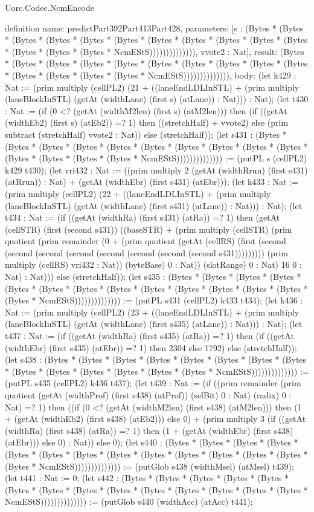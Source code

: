 \begin{lexlean}{Uorc.Codec.NcmEncode}
\begin{semanticmodule}
definition{
  name: predictPart392Part413Part428,
  parameters: [s : (Bytes * (Bytes * (Bytes * (Bytes * (Bytes * (Bytes * (Bytes * (Bytes * (Bytes * (Bytes * (Bytes * (Bytes * (Bytes * (Bytes * NcmEStS)))))))))))))), vvote2 : Nat],
  result: (Bytes * (Bytes * (Bytes * (Bytes * (Bytes * (Bytes * (Bytes * (Bytes * (Bytes * (Bytes * (Bytes * (Bytes * (Bytes * (Bytes * NcmEStS)))))))))))))),
  body: (let k429 : Nat := (prim multiply (cellPL2) (21 + ((laneEndLDLInSTL) + (prim multiply (laneBlockInSTL) (getAt (widthLane) (first s) (atLane)) : Nat))) : Nat); (let t430 : Nat := (if (0 <? (getAt (widthM2len) (first s) (atM2len))) then (if ((getAt (widthEb2) (first s) (atEb2)) =? 1) then ((stretchHalf) + vvote2) else (prim subtract (stretchHalf) vvote2 : Nat)) else (stretchHalf)); (let s431 : (Bytes * (Bytes * (Bytes * (Bytes * (Bytes * (Bytes * (Bytes * (Bytes * (Bytes * (Bytes * (Bytes * (Bytes * (Bytes * (Bytes * NcmEStS)))))))))))))) := (putPL s (cellPL2) k429 t430); (let vri432 : Nat := ((prim multiply 2 (getAt (widthRrun) (first s431) (atRrun)) : Nat) + (getAt (widthEbr) (first s431) (atEbr))); (let k433 : Nat := (prim multiply (cellPL2) (22 + ((laneEndLDLInSTL) + (prim multiply (laneBlockInSTL) (getAt (widthLane) (first s431) (atLane)) : Nat))) : Nat); (let t434 : Nat := (if ((getAt (widthRa) (first s431) (atRa)) =? 1) then (getAt (cellSTR) (first (second s431)) ((baseSTR) + (prim multiply (cellSTR) (prim quotient (prim remainder (0 + (prim quotient (getAt (cellRS) (first (second (second (second (second (second (second (second (second s431))))))))) (prim multiply (cellRS) vri432 : Nat)) (byteBase) 0 : Nat)) (slotRange) 0 : Nat) 16 0 : Nat) : Nat))) else (stretchHalf)); (let s435 : (Bytes * (Bytes * (Bytes * (Bytes * (Bytes * (Bytes * (Bytes * (Bytes * (Bytes * (Bytes * (Bytes * (Bytes * (Bytes * (Bytes * NcmEStS)))))))))))))) := (putPL s431 (cellPL2) k433 t434); (let k436 : Nat := (prim multiply (cellPL2) (23 + ((laneEndLDLInSTL) + (prim multiply (laneBlockInSTL) (getAt (widthLane) (first s435) (atLane)) : Nat))) : Nat); (let t437 : Nat := (if ((getAt (widthRa) (first s435) (atRa)) =? 1) then (if ((getAt (widthEbr) (first s435) (atEbr)) =? 1) then 2304 else 1792) else (stretchHalf)); (let s438 : (Bytes * (Bytes * (Bytes * (Bytes * (Bytes * (Bytes * (Bytes * (Bytes * (Bytes * (Bytes * (Bytes * (Bytes * (Bytes * (Bytes * NcmEStS)))))))))))))) := (putPL s435 (cellPL2) k436 t437); (let t439 : Nat := (if ((prim remainder (prim quotient (getAt (widthProf) (first s438) (atProf)) (selBit) 0 : Nat) (radix) 0 : Nat) =? 1) then ((if (0 <? (getAt (widthM2len) (first s438) (atM2len))) then (1 + (getAt (widthEb2) (first s438) (atEb2))) else 0) + (prim multiply 3 (if ((getAt (widthRa) (first s438) (atRa)) =? 1) then (1 + (getAt (widthEbr) (first s438) (atEbr))) else 0) : Nat)) else 0); (let s440 : (Bytes * (Bytes * (Bytes * (Bytes * (Bytes * (Bytes * (Bytes * (Bytes * (Bytes * (Bytes * (Bytes * (Bytes * (Bytes * (Bytes * NcmEStS)))))))))))))) := (putGlob s438 (widthMsel) (atMsel) t439); (let t441 : Nat := 0; (let s442 : (Bytes * (Bytes * (Bytes * (Bytes * (Bytes * (Bytes * (Bytes * (Bytes * (Bytes * (Bytes * (Bytes * (Bytes * (Bytes * (Bytes * NcmEStS)))))))))))))) := (putGlob s440 (widthAcc) (atAcc) t441); }
\end{semanticmodule}
\end{lexlean}
